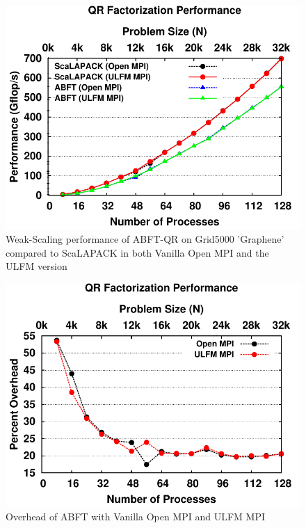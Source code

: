 \begin{figure}[t]
    \centering
    \includegraphics[width=\linewidth]{figures/g5k_results_weak}
    \caption{Weak-Scaling performance of ABFT-QR on Grid5000 'Graphene' compared to ScaLAPACK in both Vanilla Open MPI and the ULFM version}
    \label{fig:ulfm:qr-weak}
\end{figure}

\begin{figure}[t]
    \centering
    \includegraphics[width=\linewidth]{figures/g5k_results_weak_proportional}
    \caption{Overhead of ABFT with Vanilla Open MPI and ULFM MPI}
    \label{fig:ulfm:weak-overhead}
\end{figure}

